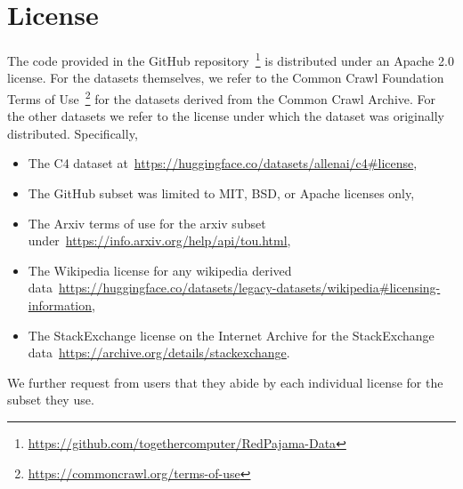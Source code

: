 \documentclass{article}
\begin{document}
\section{License}
The code provided in the GitHub repository~\footnote{\url{https://github.com/togethercomputer/RedPajama-Data}} is distributed under an Apache 2.0 license. For the datasets themselves, we refer to the Common Crawl Foundation Terms of Use~\footnote{\url{https://commoncrawl.org/terms-of-use}} for the datasets derived from the Common Crawl Archive. For the other datasets we refer to the license under which the dataset was originally distributed. Specifically,
\begin{itemize}
    \item The C4 dataset at~\url{https://huggingface.co/datasets/allenai/c4#license},
    \item The GitHub subset was limited to MIT, BSD, or Apache licenses only,
    \item The Arxiv terms of use for the arxiv subset under~\url{https://info.arxiv.org/help/api/tou.html},
    \item The Wikipedia license for any wikipedia derived data~\url{https://huggingface.co/datasets/legacy-datasets/wikipedia#licensing-information},
    \item The StackExchange license on the Internet Archive for the StackExchange data~\url{https://archive.org/details/stackexchange}.
\end{itemize}
We further request from users that they abide by each individual license for the subset they use.
\end{document}
